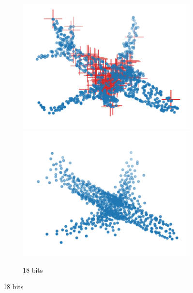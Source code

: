 \begin{figure}[t]
\begin{subfigure}[b]{\subfigureouterhspace}
\begin{subsubfigure}[b]{\subfigurehspace}
      \includegraphics[width=\linewidth]{img/point_cloud_compression/crit/test_airplane_0630/full_2.pdf}
      \includegraphics[width=\linewidth]{img/point_cloud_compression/rec/test_airplane_0630/full_2.pdf}
      \caption{18 bits}
      \label{fig:rec/full/2}
    \end{subsubfigure}%
    \hfill%
    \begin{subsubfigure}[b]{\subfigurehspace}
      \centering

\end{subsubfigure}
\end{subfigure}
\end{figure}

